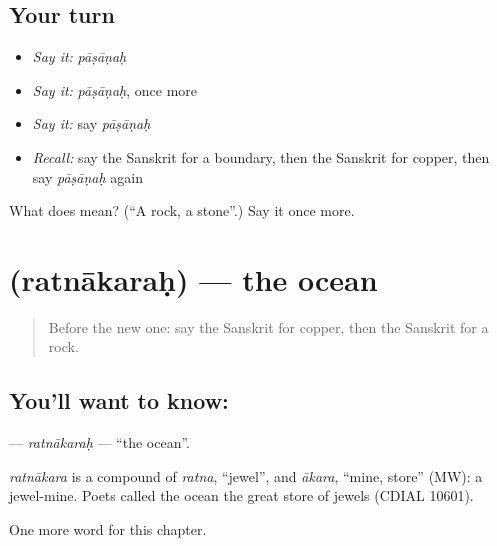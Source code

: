 \subsection*{Your turn}
\begin{itemize}
\raggedright
  \item \emph{Say it:} \emph{pāṣāṇaḥ}
  \item \emph{Say it:} \emph{pāṣāṇaḥ}, once more
  \item \emph{Say it:} say \emph{pāṣāṇaḥ}
  \item \emph{Recall:} say the Sanskrit for a boundary, then the Sanskrit for copper, then say \emph{pāṣāṇaḥ} again
\end{itemize}

\begin{tcolorbox}[breakable,colback=teal!4,colframe=teal!35!black,title={Before you move on}]
What does  mean? (\textquotedblleft{}A rock, a stone\textquotedblright{}.) Say it once more.
\end{tcolorbox}
\section[\texorpdfstring{\sk{रत्नाकरः} (ratnākaraḥ)}{रत्नाकरः (ratnākaraḥ)}]{ (ratnākaraḥ) — the ocean}

\label{lesson:SA-C196-ratnakarah}



\begin{quote}
Before the new one: say the Sanskrit for copper, then the Sanskrit for a rock.
\end{quote}

\subsection*{You'll want to know: }
\textbf{} — \emph{ratnākaraḥ} — \textquotedblleft{}the ocean\textquotedblright{}.

\begin{cousinweb}
\emph{ratnākara} is a compound of \emph{ratna}, \textquotedblleft{}jewel\textquotedblright{}, and \emph{ākara}, \textquotedblleft{}mine, store\textquotedblright{} (MW): a jewel-mine. Poets called the ocean the great store of jewels (CDIAL 10601).
\end{cousinweb}

\begin{grammarlens}[title={What you've built}]
One more word for this chapter.
\end{grammarlens}

